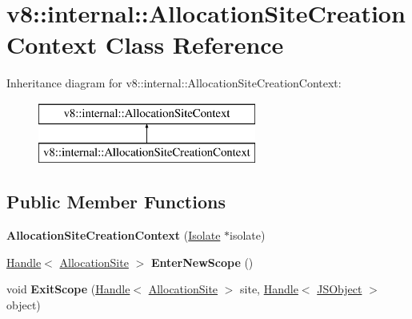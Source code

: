 \hypertarget{classv8_1_1internal_1_1_allocation_site_creation_context}{}\section{v8\+:\+:internal\+:\+:Allocation\+Site\+Creation\+Context Class Reference}
\label{classv8_1_1internal_1_1_allocation_site_creation_context}
Inheritance diagram for v8\+:\+:internal\+:\+:Allocation\+Site\+Creation\+Context\+:\begin{figure}[H]
\begin{center}
\leavevmode
\includegraphics[height=2.000000cm]{classv8_1_1internal_1_1_allocation_site_creation_context}
\end{center}
\end{figure}
\subsection*{Public Member Functions}
\begin{DoxyCompactItemize}
\item 
{\bfseries Allocation\+Site\+Creation\+Context} (\hyperlink{classv8_1_1internal_1_1_isolate}{Isolate} $\ast$isolate)\hypertarget{classv8_1_1internal_1_1_allocation_site_creation_context_a159a45da25ad238b0b67ec380121780e}{}\label{classv8_1_1internal_1_1_allocation_site_creation_context_a159a45da25ad238b0b67ec380121780e}

\item 
\hyperlink{classv8_1_1internal_1_1_handle}{Handle}$<$ \hyperlink{classv8_1_1internal_1_1_allocation_site}{Allocation\+Site} $>$ {\bfseries Enter\+New\+Scope} ()\hypertarget{classv8_1_1internal_1_1_allocation_site_creation_context_ac01c9bd1361ef78f22c301bdfdcb2076}{}\label{classv8_1_1internal_1_1_allocation_site_creation_context_ac01c9bd1361ef78f22c301bdfdcb2076}

\item 
void {\bfseries Exit\+Scope} (\hyperlink{classv8_1_1internal_1_1_handle}{Handle}$<$ \hyperlink{classv8_1_1internal_1_1_allocation_site}{Allocation\+Site} $>$ site, \hyperlink{classv8_1_1internal_1_1_handle}{Handle}$<$ \hyperlink{classv8_1_1internal_1_1_j_s_object}{J\+S\+Object} $>$ object)\hypertarget{classv8_1_1internal_1_1_allocation_site_creation_context_a42deb3f83fd733f54d1a0c32a74f2f46}{}\label{classv8_1_1internal_1_1_allocation_site_creation_context_a42deb3f83fd733f54d1a0c32a74f2f46}

\end{DoxyCompactItemize}
